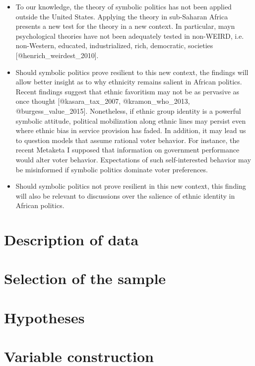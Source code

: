 \documentclass[]{article}
\begin{document}
\begin{itemize}
  \item To our knowledge, the theory of symbolic politics has not been applied outside the United States. Applying the theory in sub-Saharan Africa presents a new test for the theory in a new context. In particular, mayn psychological theories have not been adequately tested in non-WEIRD, i.e. non-Western, educated, industrialized, rich, democratic, societies [@henrich_weirdest_2010].
  \item Should symbolic politics prove resilient to this new context, the findings will allow better insight as to why ethnicity remains salient in African politics. Recent findings suggest that ethnic favoritism may not be as pervasive as once thought [@kasara_tax_2007, @kramon_who_2013, @burgess_value_2015]. Nonetheless, if ethnic group identity is a powerful symbolic attitude, political mobilization along ethnic lines may persist even where ethnic bias in service provision has faded. In addition, it may lead us to question models that assume rational voter behavior. For instance, the recent Metaketa I supposed that information on government performance would alter voter behavior. Expectations of such self-interested behavior may be misinformed if symbolic politics dominate voter preferences.
  \item Should symbolic politics not prove resilient in this new context, this finding will also be relevant to discussions over the salience of ethnic identity in African politics.
\end{itemize}

\section{Description of data}\label{description-of-data}

\section{Selection of the sample}\label{selection-of-the-sample}

\section{Hypotheses}\label{hypotheses}

\section{Variable construction}\label{variable-construction}
\end{document}
